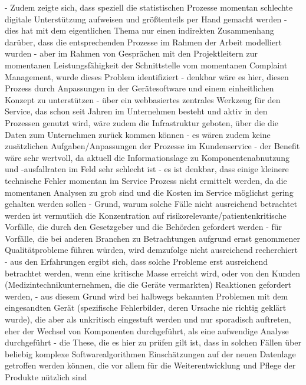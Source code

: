 \documentclass[a4paper,12pt]{report}
\begin{document}
  - Zudem zeigte sich, dass speziell die statistischen Prozesse momentan schlechte digitale Unterstützung aufweisen und größtenteils per Hand gemacht werden
  - dies hat mit dem eigentlichen Thema nur einen indirekten Zusammenhang darüber, dass die entsprechenden Prozesse im Rahmen der Arbeit modelliert wurden
  - aber im Rahmen von Gesprächen mit den Projektleitern zur momentanen Leistungsfähigkeit der Schnittstelle vom momentanen Complaint Management, wurde dieses Problem identifiziert
  - denkbar wäre es hier, diesen Prozess durch Anpassungen in der Gerätesoftware und einem einheitlichen Konzept zu unterstützen
  - über ein webbasiertes zentrales Werkzeug für den Service, das schon seit Jahren im Unternehmen besteht und aktiv in den Prozessen genutzt wird, wäre zudem die Infrastruktur geboten, über die die Daten zum Unternehmen zurück kommen können
  - es wären zudem keine zusätzlichen Aufgaben/Anpassungen der Prozesse im Kundenservice
  - der Benefit wäre sehr wertvoll, da aktuell die Informationslage zu Komponentenabnutzung und -ausfallraten im Feld sehr schlecht ist
  - es ist denkbar, dass einige kleinere technische Fehler momentan im Service Prozess nicht ermittelt werden, da die momentanen Analysen zu grob sind und die Kosten im Service möglichst gering gehalten werden sollen
  - Grund, warum solche Fälle nicht ausreichend betrachtet werden ist vermutlich die Konzentration auf risikorelevante/patientenkritische Vorfälle, die durch den Gesetzgeber und die Behörden gefordert werden
  - für Vorfälle, die bei anderen Branchen zu Betrachtungen aufgrund ernst genommener Qualitätprobleme führen würden, wird demzufolge nicht ausreichend recherchiert
  - aus den Erfahrungen ergibt sich, dass solche Probleme erst ausreichend betrachtet werden, wenn eine kritische Masse erreicht wird, oder von den Kunden (Medizintechnikunternehmen, die die Geräte vermarkten) Reaktionen gefordert werden, 
  - aus diesem Grund wird bei halbwegs bekannten Problemen mit dem eingesandten Gerät (spezifische Fehlerbilder, deren Ursache nie richtig geklärt wurde), die aber als unkritisch eingestuft werden und nur sporadisch auftreten, eher der Wechsel von Komponenten durchgeführt, als eine aufwendige Analyse durchgeführt
  - die These, die es hier zu prüfen gilt ist, dass in solchen Fällen über beliebig komplexe Softwarealgorithmen Einschätzungen auf der neuen Datenlage getroffen werden können, die vor allem für die Weiterentwicklung und Pflege der Produkte nützlich sind
\end{document}
